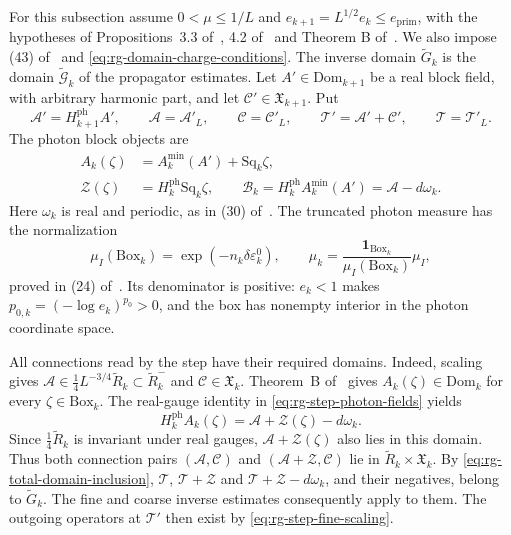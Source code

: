 \documentclass[11pt,letterpaper,reqno]{amsart}
\newcommand{\extref}[2]{#1 of~\cite{#2}}
\newcommand{\exteq}[2]{(#1) of~\cite{#2}}
\begin{document}
For this subsection assume $0<\mu\le1/L$ and
$e_{k+1}=L^{1/2}e_k\le e_{\mathrm{prim}}$, with the hypotheses
of Propositions~\extref{3.3}{FermionBlockManuscript},
\extref{4.2}{FermionBlockManuscript} and Theorem
\extref{B}{MaxwellBlockManuscript}. We also impose
\exteq{43}{MaxwellBlockManuscript} and
\eqref{eq:rg-domain-charge-conditions}.
The inverse domain $\widetilde G_k$ is the domain
$\widetilde{\mathcal G}_k$ of the propagator estimates.
Let $A'\in\mathrm{Dom}_{k+1}$ be a real block field,
with arbitrary harmonic part, and let
$\mathscr C'\in\mathfrak X_{k+1}$.
Put
\[
 \mathscr A'=H_{k+1}^{\mathrm{ph}}A',\qquad
 \mathscr A=\mathscr A'_L,\qquad
 \mathscr C=\mathscr C'_L,\qquad
 \mathscr T'=\mathscr A'+\mathscr C',\qquad
 \mathscr T=\mathscr T'_L.
\]
The photon block objects are
\begin{equation}\label{eq:rg-step-photon-fields}
 \begin{split}
 A_k(\zeta)&=A_k^{\min}(A')+\mathrm{Sq}_k\zeta,\\
 \mathscr Z(\zeta)&=H_k^{\mathrm{ph}}\mathrm{Sq}_k\zeta,\qquad
 \mathscr B_k=H_k^{\mathrm{ph}}A_k^{\min}(A')
                                      =\mathscr A-d\omega_k.
 \end{split}
\end{equation}
Here $\omega_k$ is real and periodic, as in
\exteq{30}{MaxwellBlockManuscript}.
The truncated photon measure has the normalization
\begin{equation}\label{eq:rg-step-box-normalization}
 \mu_I(\mathrm{Box}_k)=\exp(-n_k\delta\varepsilon_k^0),\qquad
 \widehat\mu_k=
              \frac{\mathbf1_{\mathrm{Box}_k}}{\mu_I(\mathrm{Box}_k)}\mu_I,
\end{equation}
proved in \exteq{24}{MaxwellBlockManuscript}.
Its denominator is positive: $e_k<1$ makes
$p_{0,k}=(-\log e_k)^{p_0}>0$, and the box has
nonempty interior in the photon coordinate space.

All connections read by the step have their required
domains. Indeed, scaling gives
$\mathscr A\in\frac14L^{-3/4}\widetilde R_k
\subset\widetilde R_k^-$ and
$\mathscr C\in\mathfrak X_k$.
Theorem~\extref{B}{MaxwellBlockManuscript}
gives $A_k(\zeta)\in\mathrm{Dom}_k$ for every
$\zeta\in\mathrm{Box}_k$.
The real-gauge identity in
\eqref{eq:rg-step-photon-fields} yields
\[
 H_k^{\mathrm{ph}}A_k(\zeta)
                 =\mathscr A+\mathscr Z(\zeta)-d\omega_k.
\]
Since $\frac14\widetilde R_k$ is invariant under
real gauges, $\mathscr A+\mathscr Z(\zeta)$ also
lies in this domain. Thus both connection pairs
$(\mathscr A,\mathscr C)$ and
$(\mathscr A+\mathscr Z,\mathscr C)$ lie in
$\widetilde R_k\times\mathfrak X_k$.
By \eqref{eq:rg-total-domain-inclusion},
$\mathscr T$, $\mathscr T+\mathscr Z$ and
$\mathscr T+\mathscr Z-d\omega_k$, and their negatives,
belong to $\widetilde G_k$.
The fine and coarse inverse estimates consequently
apply to them. The outgoing operators at
$\mathscr T'$ then exist by
\eqref{eq:rg-step-fine-scaling}.
\end{document}
